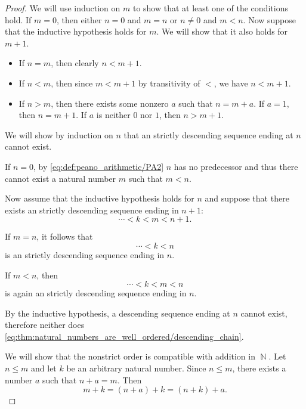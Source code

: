 \begin{proof}
  We will use induction on \( m \) to show that at least one of the conditions hold. If \( m = 0 \), then either \( n = 0 \) and \( m = n \) or \( n \neq 0 \) and \( m < n \). Now suppose that the inductive hypothesis holds for \( m \). We will show that it also holds for \( m + 1 \).
  \begin{itemize}
    \item If \( n = m \), then clearly \( n < m + 1 \).
    \item If \( n < m \), then since \( m < m + 1 \) by transitivity of \( < \), we have \( n < m + 1 \).
    \item If \( n > m \), then there exists some nonzero \( a \) such that \( n = m + a \). If \( a = 1 \), then \( n = m + 1 \). If \( a \) is neither \( 0 \) nor \( 1 \), then \( n > m + 1 \).
  \end{itemize}

   We will show by induction on \( n \) that an strictly descending sequence ending at \( n \) cannot exist.

  If \( n = 0 \), by \eqref{eq:def:peano_arithmetic/PA2} \( n \) has no predecessor and thus there cannot exist a natural number \( m \) such that \( m < n \).

  Now assume that the inductive hypothesis holds for \( n \) and suppose that there exists an strictly descending sequence ending in \( n + 1 \):
  \begin{equation}\label{eq:thm:natural_numbers_are_well_ordered/descending_chain}
    \cdots < k < m < n + 1.
  \end{equation}

  If \( m = n \), it follows that
  \begin{equation*}
    \cdots < k < n
  \end{equation*}
  is an strictly descending sequence ending in \( n \).

  If \( m < n \), then
  \begin{equation*}
    \cdots < k < m < n
  \end{equation*}
  is again an strictly descending sequence ending in \( n \).

  By the inductive hypothesis, a descending sequence ending at \( n \) cannot exist, therefore neither does \eqref{eq:thm:natural_numbers_are_well_ordered/descending_chain}.

   We will show that the nonstrict order is compatible with addition in \( \BbbN \). Let \( n \leq m \) and let \( k \) be an arbitrary natural number. Since \( n \leq m \), there exists a number \( a \) such that \( n + a = m \). Then
  \begin{equation*}
    m + k = (n + a) + k = (n + k) + a.
  \end{equation*}


\end{proof}
